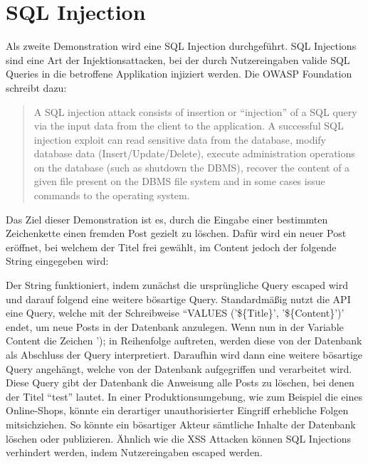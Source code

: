 \section{SQL Injection}
Als zweite Demonstration wird eine SQL Injection durchgeführt. SQL Injections sind eine Art der Injektionsattacken, bei der durch Nutzereingaben valide SQL Queries in die betroffene Applikation injiziert werden. Die OWASP Foundation schreibt dazu: 
\begin{quote}
    A SQL injection attack consists of insertion or “injection” of a SQL query via the input data from the client to the application. A successful SQL injection exploit can read sensitive data from the database, modify database data (Insert/Update/Delete), execute administration operations on the database (such as shutdown the DBMS), recover the content of a given file present on the DBMS file system and in some cases issue commands to the operating system. \cite{abc}
\end{quote}

Das Ziel dieser Demonstration ist es, durch die Eingabe einer bestimmten Zeichenkette einen fremden Post gezielt zu löschen. Dafür wird ein neuer Post eröffnet, bei welchem der Titel frei gewählt, im Content jedoch der folgende String eingegeben wird: 



Der String funktioniert, indem zunächst die ursprüngliche Query escaped wird und darauf folgend eine weitere bösartige Query. 
Standardmäßig nutzt die API eine Query, welche mit der Schreibweise ``VALUES ('\$\{Title\}', '\$\{Content\}')' endet, um neue Posts in der Datenbank anzulegen. Wenn nun in der Variable Content die Zeichen '); in Reihenfolge auftreten, werden diese von der Datenbank als Abschluss der Query interpretiert. Daraufhin wird dann eine weitere bösartige Query angehängt, welche von der Datenbank aufgegriffen und verarbeitet wird. Diese Query gibt der Datenbank die Anweisung alle Posts zu löschen, bei denen der Titel ``test'' lautet. 
In einer Produktionsumgebung, wie zum Beispiel die eines Online-Shops, könnte ein derartiger unauthorisierter Eingriff erhebliche Folgen mitsichziehen. So könnte ein bösartiger Akteur sämtliche Inhalte der Datenbank löschen oder publizieren. 
Ähnlich wie die \ac{XSS} Attacken können SQL Injections verhindert werden, indem Nutzereingaben escaped werden.
